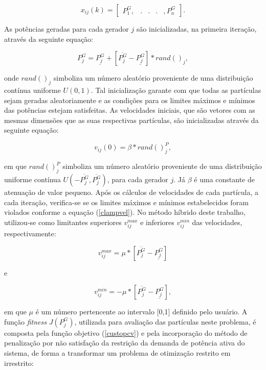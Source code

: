 \documentclass[
	12pt,				%
	openany,			%
	twoside,			%
	a4paper,			%
	chapter=TITLE,		%
	section=Title,		%
	subsection=Title,	%
	subsubsection=Title,%
	english,			%
	french,				%
	spanish,			%
	brazil			%
	]{abntex2}
\begin{document}
\begin{ERRATA}
\begin{equation}
x_{ij}(k) = \begin{bmatrix}
P^G_1, & . & . & . &, P^G_n
\end{bmatrix}.
\end{equation}

As potências geradas para cada gerador $j$ são inicializadas, na primeira iteração, através da seguinte equação:

\begin{equation}\label{estrategia}
P^G_j = \underline{P^G_j} + [\overline{P^G_j}-\underline{P^G_j}]*rand()_j,
\end{equation}

\noindent onde $rand()_j$ simboliza um número aleatório proveniente de uma distribuição contínua uniforme $U(0,1)$. Tal inicialização garante com que todas as partículas sejam geradas aleatoriamente e as condições para os limites máximos e mínimos das potências estejam satisfeitas. As velocidades iniciais, que são vetores com as mesmas dimensões que as suas respectivas partículas, são inicializadas através da seguinte equação:

\begin{equation}\label{estrategia2}
v_{ij}(0) = \beta*rand()_j^{P},
\end{equation}

\noindent em que $rand()_j^{P}$ simboliza um número aleatório proveniente de uma distribuição uniforme contínua $U(-\overline{P^G_j},\overline{P^G_j})$, para cada gerador $j$. Já $\beta$ é uma constante de atenuação de valor pequeno. Após os cálculos de velocidades de cada partícula, a cada iteração, verifica-se se os limites máximos e mínimos estabelecidos foram violados conforme a equação (\ref{clampvel}). No método híbrido deste trabalho, utilizou-se como limitantes superiores $v^{max}_{ij}$ e inferiores $v^{min}_{ij}$ das velocidades, respectivamente:

\begin{equation}\label{vmax}
v^{max}_{ij} = \mu*[\overline{P^G_j}-\underline{P^G_j}]
\end{equation}

\noindent e

\begin{equation}\label{vmin}
v^{min}_{ij} = - \mu*[\overline{P^G_j}-\underline{P^G_j}],
\end{equation}

\noindent em que $\mu$ é um número pertencente ao intervalo [0,1] definido pelo usuário. A função \emph{fitness} $J(P^G_j)$, utilizada para avaliação das partículas neste problema, é composta pela função objetivo (\ref{custopcv}) e pela incorporação do método de penalização \cite{manual} por não satisfação da restrição da demanda de potência ativa do sistema, de forma a transformar um problema de otimização restrito em irrestrito:


\end{ERRATA}
\end{document}
